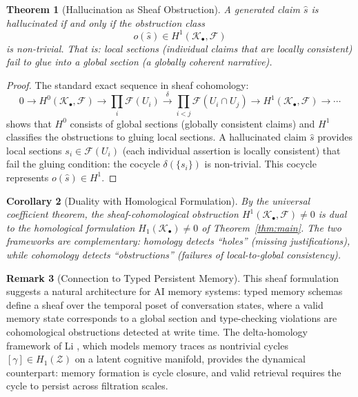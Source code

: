 \documentclass[11pt,a4paper]{article}
\theoremstyle{plain}
\newtheorem{theorem}{Theorem}[section]
\newtheorem{corollary}[theorem]{Corollary}
\theoremstyle{definition}
\newtheorem{remark}[theorem]{Remark}
\begin{document}
\begin{theorem}[Hallucination as Sheaf Obstruction]\label{thm:sheaf}
A generated claim $\hat{s}$ is hallucinated if and only if the obstruction class
\begin{equation}\label{eq:obstruction}
  o(\hat{s}) \in H^1(\mathcal{K}_\bullet, \mathcal{F})
\end{equation}
is non-trivial. That is: local sections (individual claims that are locally consistent) fail to glue into a global section (a globally coherent narrative).
\end{theorem}

\begin{proof}
The standard exact sequence in sheaf cohomology:
\[
  0 \to H^0(\mathcal{K}_\bullet, \mathcal{F}) \to \prod_i \mathcal{F}(U_i) \xrightarrow{\delta} \prod_{i<j} \mathcal{F}(U_i \cap U_j) \to H^1(\mathcal{K}_\bullet, \mathcal{F}) \to \cdots
\]
shows that $H^0$ consists of global sections (globally consistent claims) and $H^1$ classifies the obstructions to gluing local sections. A hallucinated claim $\hat{s}$ provides local sections $s_i \in \mathcal{F}(U_i)$ (each individual assertion is locally consistent) that fail the gluing condition: the cocycle $\delta(\{s_i\})$ is non-trivial. This cocycle represents $o(\hat{s}) \in H^1$.
\end{proof}

\begin{corollary}[Duality with Homological Formulation]
By the universal coefficient theorem, the sheaf-cohomological obstruction $H^1(\mathcal{K}_\bullet, \mathcal{F}) \neq 0$ is dual to the homological formulation $H_1(\mathcal{K}_\bullet) \neq 0$ of Theorem~\ref{thm:main}. The two frameworks are complementary: homology detects ``holes'' (missing justifications), while cohomology detects ``obstructions'' (failures of local-to-global consistency).
\end{corollary}

\begin{remark}[Connection to Typed Persistent Memory]
This sheaf formulation suggests a natural architecture for AI memory systems: typed memory schemas define a sheaf over the temporal poset of conversation states, where a valid memory state corresponds to a global section and type-checking violations are cohomological obstructions detected at write time. The delta-homology framework of Li \cite{li2025memory}, which models memory traces as nontrivial cycles $[\gamma] \in H_1(\mathcal{Z})$ on a latent cognitive manifold, provides the dynamical counterpart: memory formation is cycle closure, and valid retrieval requires the cycle to persist across filtration scales.
\end{remark}
\end{document}
